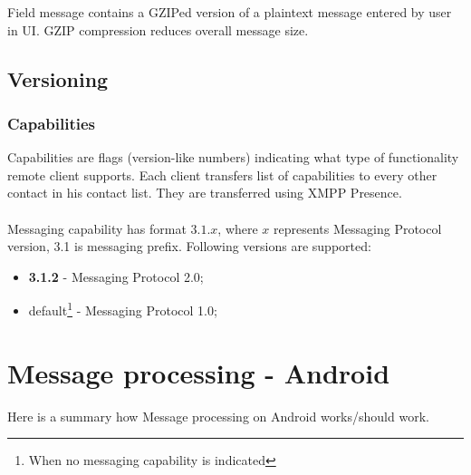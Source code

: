 \documentclass[a4paper,10pt]{article}
\begin{document}
Field message contains a GZIPed version of a plaintext message entered by user in UI. GZIP compression reduces 
overall message size.

\subsection{Versioning}

\subsubsection{Capabilities}
Capabilities are flags (version-like numbers) indicating what type of functionality remote client supports. Each client transfers list of capabilities to every other contact in his contact list. They are transferred using XMPP Presence.\\ \\
Messaging capability has format $3.1.x$, where $x$ represents Messaging Protocol version, 3.1 is messaging prefix. Following versions are supported:

\begin{itemize}
\item \textbf{3.1.2} - Messaging Protocol 2.0;
\item default\footnote{When no messaging capability is indicated} - Messaging Protocol 1.0;

\end{itemize}





\section{Message processing - Android}
Here is a summary how Message processing on Android works/should work.
\end{document}
